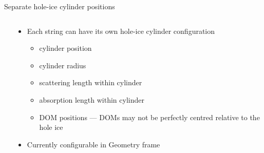 
\begin{frame}[fragile]{Separate hole-ice cylinder positions}

  \begin{columns}
    \begin{column}{0.5\textwidth}


    \end{column}
    \begin{column}{0.5\textwidth}

      \begin{itemize}
        \item Each string can have its own hole-ice cylinder configuration
          \begin{itemize}
            \item cylinder position
            \item cylinder radius
            \item scattering length within cylinder
            \item absorption length within cylinder
            \item DOM positions --- DOMs may not be perfectly centred relative to the hole ice
          \end{itemize}

        \item Currently configurable in Geometry frame

      \end{itemize}


    \end{column}
  \end{columns}

\end{frame}



